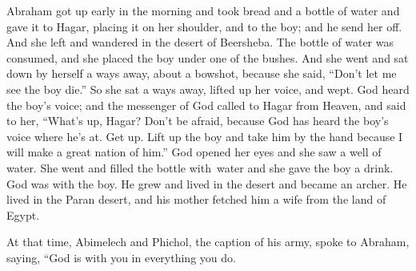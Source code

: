 \begin{inparaenum}
     Abraham got up early in the morning and took bread and a bottle of water and gave it to Hagar, placing it on her shoulder, and to the boy; and he send her off. And she left and wandered in the desert of Beersheba.%
     The bottle of water was consumed, and she placed the boy under one of the bushes.%
     And she went and sat down by herself a ways away, about a bowshot, because she said, ``Don't let me see the boy die.'' So she sat a ways away, lifted up her voice, and wept.%
     God heard the boy's voice; and the messenger of God called to Hagar from Heaven, and said to her, ``What's up, Hagar? Don't be afraid, because God has heard the boy's voice where he's at.%
     Get up. Lift up the boy and take him by the hand because I will make a great nation of him.''%
     God opened her eyes and she saw a well of water. She went and filled the bottle with\understood\ water and she gave the boy a drink.%
     God was with the boy. He grew and lived in the desert and became an archer.%
     He lived in the Paran desert, and his mother fetched him a wife from the land of Egypt.%
    
     At that time, Abimelech and Phichol, the caption of his army, spoke to Abraham, saying, ``God is with you in everything you do.%
\end{inparaenum}
